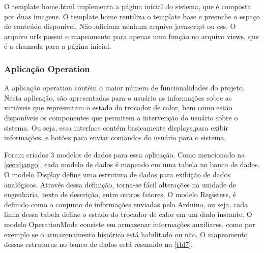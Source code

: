 	O template home.html implementa a página inicial do sistema, que é composta por duas imagens. O template home reutiliza o template base e preenche o espaço de conteúdo disponível. Não adiciona nenhum arquivo javascript ou css. O arquivo urls possui o mapeamento para apenas uma função no arquivo views, que é a chamada para a página inicial.
	
	\subsubsection{Aplicação Operation}
	A aplicação operation contém o maior número de funcionalidades do projeto. Nesta aplicação, são apresentadas para o usuário as informações sobre as variáveis que representam o estado do trocador de calor, bem como estão disponíveis os componentes que permitem a intervenção do usuário sobre o sistema. Ou seja, essa interface contém basicamente displays,para exibir informações, e botões para enviar comandos do usuário para o sistema.
	
	Foram criados 3 modelos de dados para essa aplicação. Como mencionado na \autoref{sec:django}, cada modelo de dados é mapeado em uma tabela no banco de dados. O modelo Display define uma estrutura de dados para exibição de dados analógicos. Através dessa definição, torna-se fácil alterações na unidade de engenharia, texto de descrição, entre outros fatores. O modelo Registers, é definido como o conjunto de informações enviadas pelo Arduino, ou seja, cada linha dessa tabela define o estado do trocador de calor em um dado instante. O modelo OperationMode consiste em armazenar informações auxiliares, como por exemplo se o armazenamento histórico está habilitado ou não. O mapeamento dessas estruturas no banco de dados está resumido na \autoref{tbl7}.
	
	\begin{table}[!htb]
		\centering
		\caption{Modelos definidos no sistema}
		\label{tbl7}
		\def\arraystretch{1.3}
	\end{table}
	

